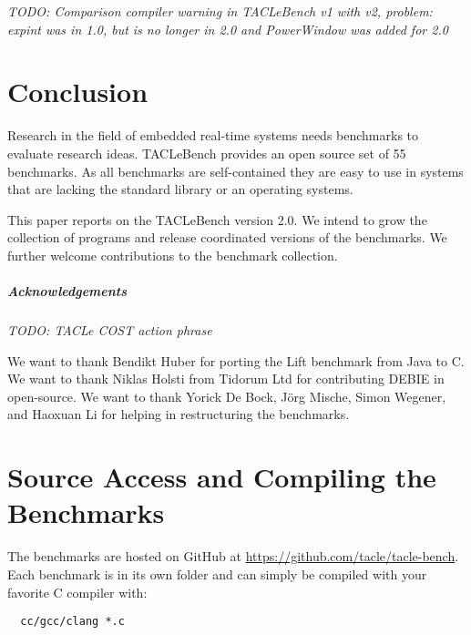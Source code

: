 \documentclass[a4paper,UKenglish]{oasics}
\newcommand{\todo}[1]{{\emph{TODO: #1}}}
\newcommand{\benchcount}{55 }
\begin{document}
\todo{Comparison compiler warning in TACLeBench v1 with v2, problem: expint was in 1.0, but is no
longer in 2.0 and PowerWindow was added for 2.0}

%


\section{Conclusion}
\label{sec:conclusion}

Research in the field of embedded real-time systems needs benchmarks to
evaluate research ideas. TACLeBench provides an open source set of
\benchcount benchmarks. As all benchmarks are self-contained they are easy to
use in systems that are lacking the standard library or an operating systems.

This paper reports on the TACLeBench version 2.0. We intend to grow the
collection of programs and release coordinated versions of the benchmarks.
We further welcome contributions to the benchmark collection.



\subparagraph*{Acknowledgements}

\todo{TACLe COST action phrase}

We want to thank Bendikt Huber for porting the Lift benchmark from Java to C.
We want to thank Niklas Holsti from Tidorum Ltd for contributing DEBIE in open-source.
We want to thank Yorick De Bock, J{\"o}rg Mische, Simon Wegener, and Haoxuan Li for helping in restructuring the benchmarks.

\appendix
\section{Source Access and Compiling the Benchmarks}

The benchmarks are hosted on GitHub at \url{https://github.com/tacle/tacle-bench}.
Each benchmark is in its own folder and can simply be compiled with your favorite
C compiler with:

\begin{verbatim}
  cc/gcc/clang *.c
\end{verbatim}




\end{document}

